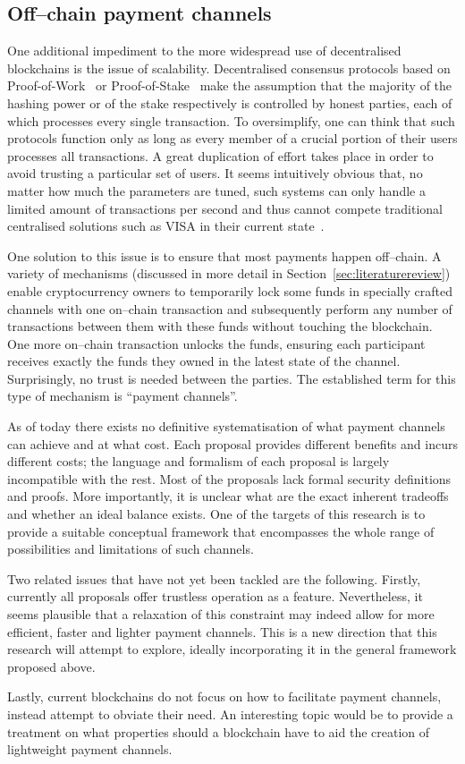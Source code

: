 \subsection{Off--chain payment channels}
  One additional impediment to the more widespread use of decentralised blockchains is the
  issue of scalability. Decentralised consensus protocols based on
  Proof-of-Work~\cite{hashcash} or Proof-of-Stake~\cite{ouroboros} make the assumption
  that the majority of the hashing power or of the stake respectively is controlled by
  honest parties, each of which processes every single transaction. To oversimplify, one
  can think that such protocols function only as long as every member of a crucial portion
  of their users processes all transactions. A great duplication of effort takes place in
  order to avoid trusting a particular set of users. It seems intuitively obvious that, no
  matter how much the parameters are tuned, such systems can only handle a limited amount
  of transactions per second and thus cannot compete traditional centralised solutions
  such as VISA in their current state~\cite{tps}.

  One solution to this issue is to ensure that most payments happen off--chain. A variety
  of mechanisms (discussed in more detail in Section~\ref{sec:literaturereview}) enable
  cryptocurrency owners to temporarily lock some funds in specially crafted channels with
  one on--chain transaction and subsequently perform any number of transactions between
  them with these funds without touching the blockchain. One more on--chain transaction
  unlocks the funds, ensuring each participant receives exactly the funds they owned in
  the latest state of the channel. Surprisingly, no trust is needed between the parties.
  The established term for this type of mechanism is ``payment channels''.

  As of today there exists no definitive systematisation of what payment channels can
  achieve and at what cost. Each proposal provides different benefits and incurs different
  costs; the language and formalism of each proposal is largely incompatible with the
  rest. Most of the proposals lack formal security definitions and proofs. More
  importantly, it is unclear what are the exact inherent tradeoffs and whether an ideal
  balance exists. One of the targets of this research is to provide a suitable conceptual
  framework that encompasses the whole range of possibilities and limitations of such
  channels.

  Two related issues that have not yet been tackled are the following. Firstly, currently
  all proposals offer trustless operation as a feature. Nevertheless, it seems plausible
  that a relaxation of this constraint may indeed allow for more efficient, faster and
  lighter payment channels. This is a new direction that this research will attempt to
  explore, ideally incorporating it in the general framework proposed above.

  Lastly, current blockchains do not focus on how to facilitate payment channels, instead
  attempt to obviate their need. An interesting topic would be to provide a treatment on
  what properties should a blockchain have to aid the creation of lightweight payment
  channels.
